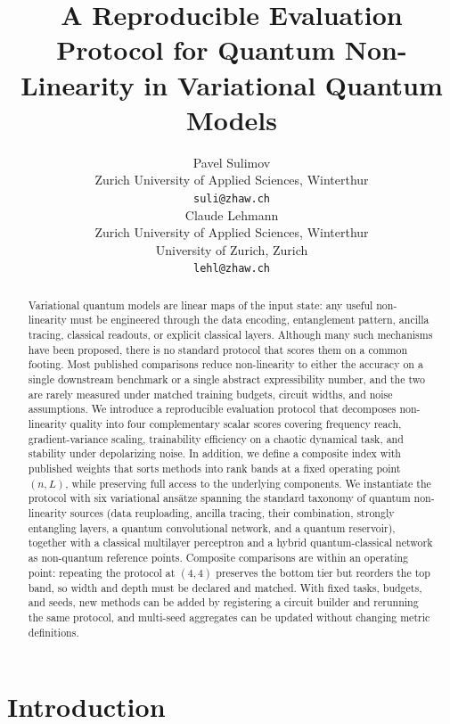 \documentclass{article}
\title{A Reproducible Evaluation Protocol for Quantum Non-Linearity in Variational Quantum Models}
\author{%
  Pavel Sulimov \\
  Zurich University of Applied Sciences, Winterthur \\
  \texttt{suli@zhaw.ch} \\
  \And
  Claude Lehmann \\
  Zurich University of Applied Sciences, Winterthur \\
  University of Zurich, Zurich \\
  \texttt{lehl@zhaw.ch} \\
}
\begin{document}
\maketitle

\begin{abstract}
Variational quantum models are linear maps of the input state: any useful non-linearity must be engineered through the data encoding, entanglement pattern, ancilla tracing, classical readouts, or explicit classical layers.
Although many such mechanisms have been proposed, there is no standard protocol that scores them on a common footing.
Most published comparisons reduce non-linearity to either the accuracy on a single downstream benchmark or a single abstract expressibility number, and the two are rarely measured under matched training budgets, circuit widths, and noise assumptions.
We introduce a reproducible evaluation protocol that decomposes non-linearity quality into four complementary scalar scores covering frequency reach, gradient-variance scaling, trainability efficiency on a chaotic dynamical task, and stability under depolarizing noise. In addition, we define a composite index with published weights that sorts methods into rank bands at a fixed operating point $(n,L)$, while preserving full access to the underlying components.
We instantiate the protocol with six variational ans\"atze spanning the standard taxonomy of quantum non-linearity sources (data reuploading, ancilla tracing, their combination, strongly entangling layers, a quantum convolutional network, and a quantum reservoir), together with a classical multilayer perceptron and a hybrid quantum-classical network as non-quantum reference points.
Composite comparisons are within an operating point: repeating the protocol at $(4,4)$ preserves the bottom tier but reorders the top band, so width and depth must be declared and matched.
With fixed tasks, budgets, and seeds, new methods can be added by registering a circuit builder and rerunning the same protocol, and multi-seed aggregates can be updated without changing metric definitions.
\end{abstract}

\section{Introduction}
\label{sec:introduction}
\end{document}
